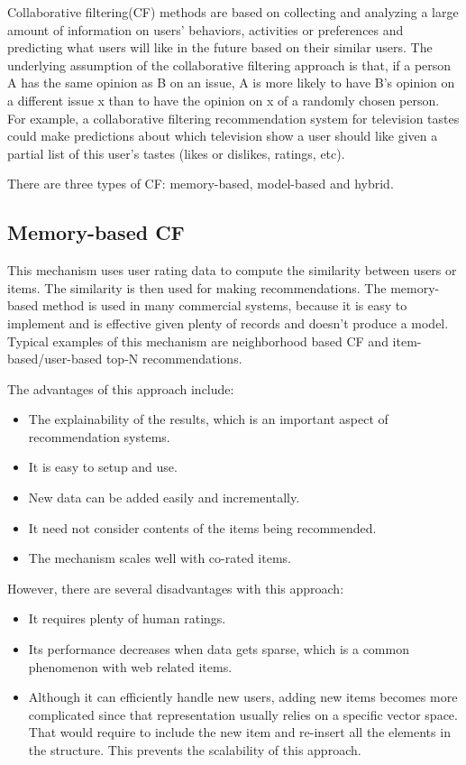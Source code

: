 Collaborative filtering(CF) methods are based on collecting and analyzing a large amount of information on users' behaviors, activities or preferences and predicting what users will like in the future based on their similar users. The underlying assumption of the collaborative filtering approach is that, if a person A has the same opinion as B on an issue, A is more likely to have B's opinion on a different issue x than to have the opinion on x of a randomly chosen person. For example, a collaborative filtering recommendation system for television tastes could make predictions about which television show a user should like given a partial list of this user's tastes (likes or dislikes, ratings, etc).

There are three types of CF: memory-based, model-based and hybrid.

\hspace{0.05in}
\subsection{Memory-based CF}
This mechanism uses user rating data to compute the similarity between users or items. The similarity is then used for making recommendations. The memory-based method is used in many commercial systems, because it is easy to implement and is effective given plenty of records and doesn't produce a model. Typical examples of this mechanism are neighborhood based CF and item-based/user-based top-N recommendations\cite{su2009survey}.

The advantages of this approach include:
\begin{itemize}
\item The explainability of the results, which is an important aspect of recommendation systems.
\item It is easy to setup and use.
\item New data can be added easily and incrementally.
\item It need not consider contents of the items being recommended.
\item The mechanism scales well with co-rated items.
\end{itemize}

However, there are several disadvantages with this approach:
\begin{itemize}
\item It requires plenty of human ratings.
\item Its performance decreases when data gets sparse, which is a common phenomenon with web related items.
\item Although it can efficiently handle new users, adding new items becomes more complicated since that representation usually relies on a specific vector space. That would require to include the new item and re-insert all the elements in the structure. This prevents the scalability of this approach.
\end{itemize}

